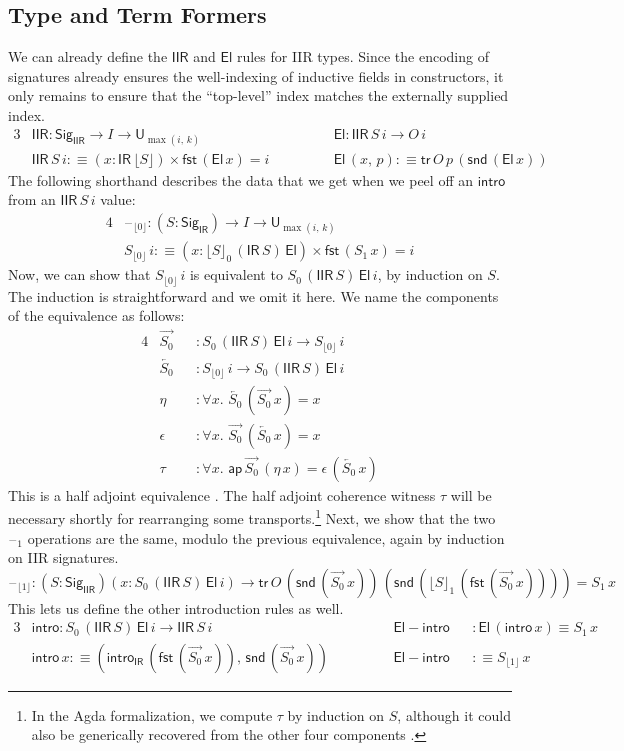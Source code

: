 \documentclass[acmsmall,screen,review,anonymous]{acmart}
\newcommand{\msf}[1]{{\mathsf{#1}}}
\newcommand{\U}{\msf{U}}
\newcommand{\El}{\msf{El}}
\newcommand{\Sig}{\msf{Sig}}
\newcommand{\blank}{{\mathord{\hspace{1pt}\text{--}\hspace{1pt}}}}
\newcommand{\IR}{\msf{IR}}
\newcommand{\intro}{\msf{intro}}
\newcommand{\tr}{\msf{tr}}
\newcommand{\fst}{\msf{fst}}
\newcommand{\snd}{\msf{snd}}
\newcommand{\IIR}{\msf{IIR}}
\newcommand{\Sigr}[1]{\lfloor #1 \rfloor}
\newcommand{\floord}[1]{\lfloor #1 \rfloor}
\newcommand{\ora}[1]{\overrightarrow{#1}}
\newcommand{\ola}[1]{\overleftarrow{#1}}
\newcommand{\ap}{\msf{ap}}
\begin{document}
\subsection{Type and Term Formers} We can already define the $\IIR$ and $\El$ rules for IIR types. Since the encoding of signatures
already ensures the well-indexing of inductive fields in constructors, it only remains to ensure
that the ``top-level'' index matches the externally supplied index.
\begin{alignat*}{3}
  &\IIR : \Sig_\IIR \to I \to \U_{\max(i,\,k)}                         && \El : \IIR\,S\,i \to O\,i \\
  &\IIR\,S\,i :\equiv (x : \IR\,\Sigr{S}) \times \fst\,(\El\,x) = i \hspace{3em}&& \El\,(x,\,p) :\equiv \tr\,O\,p\,(\snd\,(\El\,x))
\end{alignat*}
The following shorthand describes the data that we get when we peel off an $\intro$ from an $\IIR\,S\,i$ value:
\begin{alignat*}{4}
  &\blank_{\floord{0}} : (S : \Sig_\IR) \to I \to \U_{\max(i,\,k)}\\
  &S_{\floord{0}}\,i :\equiv (x : \floord{S}_0\,(\IR\,S)\,\El) \times \fst\,(S_1\,x) = i
\end{alignat*}
Now, we can show that $S_{\floord{0}}\,i$ is equivalent to $S_0\,(\IIR\,S)\,\El\,i$, by induction on
$S$. The induction is straightforward and we omit it here. We name the components of the equivalence
as follows:
\begin{alignat*}{4}
  &\ora{S_0} &&: S_0\,(\IIR\,S)\,\El\,i \to S_{\floord{0}}\,i \\
  &\ola{S_0} &&: S_{\floord{0}}\,i \to S_0\,(\IIR\,S)\,\El\,i \\
  &\eta      &&: \forall x.\,\,\ola{S_0}\,(\ora{S_0}\,x) = x \\
  &\epsilon  &&: \forall x.\,\,\ora{S_0}\,(\ola{S_0}\,x) = x \\
  &\tau      &&: \forall x.\,\,\ap\,\ora{S_0}\,(\eta\,x) = \epsilon\,(\ola{S_0}\,x)
\end{alignat*}
This is a half adjoint equivalence \cite{TODO}. The half adjoint coherence witness $\tau$ will be
necessary shortly for rearranging some transports.\footnote{In the Agda formalization, we
compute $\tau$ by induction on $S$, although it could also be generically recovered from the other
four components \cite{TODO}.} Next, we show that the two $\blank_1$ operations are the same, modulo
the previous equivalence, again by induction on IIR signatures.
\[\blank_{\floord{1}} : (S : \Sig_\IIR)(x : S_0\,(\IIR\,S)\,\El\,i) \to \tr\,O\,(\snd\,(\ora{S_0}\,x))\,(\snd\,(\floord{S}_1\,(\fst\,(\ora{S_0}\,x)))) = S_1\,x\]
This lets us define the other introduction rules as well.
\begin{alignat*}{3}
  &\intro    : S_0\,(\IIR\,S)\,\El\,i \to \IIR\,S\,i && \msf{El\!\!-\!\!intro} && : \El\,(\intro\,x) \equiv S_1\,x \\
  &\intro\,x :\equiv (\intro_\IR\,(\fst\,(\ora{S_0}\,x)),\,\snd\,(\ora{S_0}\,x)) \quad\quad\quad&& \msf{El\!\!-\!\!intro} && :\equiv S_{\floord{1}}\,x
\end{alignat*}
\end{document}
